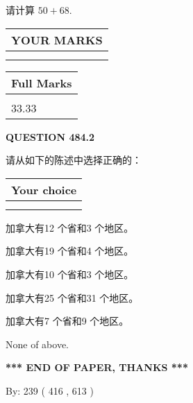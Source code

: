\documentclass{ctexart}
\begin{document}
  
 
请计算 $ %
50 +  %
68 $.
 

 

 
  
\vspace{0.2in}
  
\noindent\begin{tabular}{|l|}
\hline
 YOUR MARKS  \\
\hline
 \\ 
 \\ 
\hline
\end{tabular}
\hspace{0.05in} \begin{tabular}{|l|}
\hline
 Full Marks  \\
\hline
 \\ 
33.33 \\
\hline
\end{tabular}
{\textbf{\Large{QUESTION
484.2 
}}}
  
  
请从如下的陈述中选择正确的：
  
  
\noindent\hspace{3.0in} \begin{tabular}{|l|}
\hline
Your choice \\
\hline
 \\ 
 \\ 
\hline
\end{tabular}
  
  
 
 
加拿大有12 个省和3 个地区。
 
 
加拿大有19 个省和4 个地区。
 
 
加拿大有10 个省和3 个地区。
 
 
加拿大有25 个省和31 个地区。
 
 
加拿大有7 个省和9 个地区。
 
 
 None of above.
 
 
   
   
 \vspace{0.2in}
 
   
   
   
   
\vspace{1.0in} 
{\textbf{\large{ *** END OF PAPER, THANKS *** }}} 
   
   
\hspace{1.0in} By: 
 239 ( 416 ,  613 )
   
\end{document}
